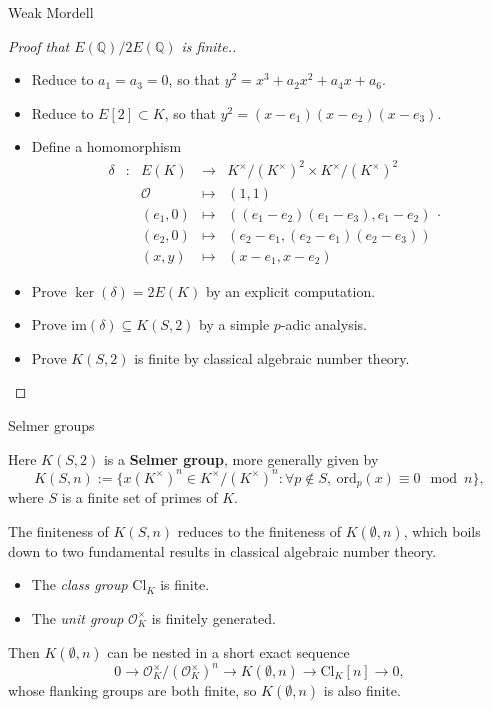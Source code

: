 \documentclass[10pt]{beamer}
\begin{document}
\begin{frame}[t]{Weak Mordell}

\begin{proof}[Proof that $ E(\mathbb{Q}) / 2E(\mathbb{Q}) $ is finite.]
\begin{itemize}
\item Reduce to $ a_1 = a_3 = 0 $, so that $ y^2 = x^3 + a_2x^2 + a_4x + a_6 $.
\item Reduce to $ E[2] \subset K $, so that $ y^2 = (x - e_1)(x - e_2)(x - e_3) $.
\item Define a homomorphism
$$
\begin{array}{rrrcc}
\delta & : & E(K) & \longrightarrow & K^\times / (K^\times)^2 \times K^\times / (K^\times)^2 \\
& & \mathcal{O} & \longmapsto & (1, 1) \\
& & (e_1, 0) & \longmapsto & ((e_1 - e_2)(e_1 - e_3), e_1 - e_2) \\
& & (e_2, 0) & \longmapsto & (e_2 - e_1, (e_2 - e_1)(e_2 - e_3)) \\
& & (x, y) & \longmapsto & (x - e_1, x - e_2)
\end{array}.
$$
\item Prove $ \ker(\delta) = 2E(K) $ by an explicit computation.
\item Prove $ \mathrm{im}(\delta) \subseteq K(S, 2) $ by a simple $ p $-adic analysis.
\item Prove $ K(S, 2) $ is finite by classical algebraic number theory.
\end{itemize}
\end{proof}

\end{frame}

\begin{frame}[t]{Selmer groups}

Here $ K(S, 2) $ is a \textbf{Selmer group}, more generally given by
$$ K(S, n) := \{x(K^\times)^n \in K^\times / (K^\times)^n : \forall p \notin S, \ \mathrm{ord}_p(x) \equiv 0 \mod n\}, $$
where $ S $ is a finite set of primes of $ K $.

\vspace{0.5cm}

The finiteness of $ K(S, n) $ reduces to the finiteness of $ K(\emptyset, n) $, which boils down to two fundamental results in classical algebraic number theory.
\begin{itemize}
\item The \emph{class group} $ \mathrm{Cl}_K $ is finite.
\item The \emph{unit group} $ \mathcal{O}_K^\times $ is finitely generated.
\end{itemize}

\vspace{0.5cm}

Then $ K(\emptyset, n) $ can be nested in a short exact sequence
$$ 0 \to \mathcal{O}_K^\times / (\mathcal{O}_K^\times)^n \to K(\emptyset, n) \to \mathrm{Cl}_K[n] \to 0, $$
whose flanking groups are both finite, so $ K(\emptyset, n) $ is also finite.

\end{frame}
\end{document}
